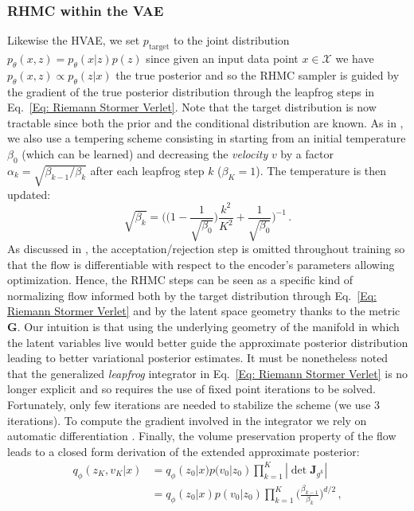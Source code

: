 \documentclass[10pt,journal,compsoc]{IEEEtran}
\begin{document}
    \subsubsection{RHMC within the VAE}\label{Subsec: RHMC within VAE}
    Likewise the HVAE, we set $p_{\mathrm{target}}$ to the joint distribution $p_{\theta}(x, z) = p_{\theta}(x|z)p(z)$ since given an input data point $x\in \mathcal{X}$ we have $p_{\theta}(x, z) \propto p_{\theta}(z|x)$ the true posterior and so the RHMC sampler is guided by the gradient of the true posterior distribution through the leapfrog steps in Eq.~\eqref{Eq: Riemann Stormer Verlet}. Note that the target distribution is now tractable since both the prior and the conditional distribution are known. As in \cite{caterini_hamiltonian_2018}, we also use a tempering scheme  consisting in starting from an initial temperature $\beta_0$ (which can be learned) and decreasing the \textit{velocity} $v$ by a factor $\alpha_k = \sqrt{\beta_{k-1} / \beta_k}$ after each leapfrog step $k$ ($\beta_K=1$). The temperature is then updated:
    \[
        \sqrt{\beta_k} = \Biggl(\Biggl(1 - \frac{1}{\sqrt{\beta_0}} \Bigg) \frac{k^2}{K^2} + \frac{1}{\sqrt{\beta_0}} \Bigg)^{-1} \,.
    \] As discussed in \cite{salimans_markov_2015},  the acceptation/rejection step is omitted throughout training so that the flow is differentiable with respect to the encoder's parameters allowing optimization. Hence, the RHMC steps can be seen as a specific kind of normalizing flow informed both by the target distribution through Eq.~\eqref{Eq: Riemann Stormer Verlet} and by the latent space geometry thanks to the metric $\mathbf{G}$. Our intuition is that using the underlying geometry of the manifold in which the latent variables live would better guide the approximate posterior distribution leading to better variational posterior estimates. It must be nonetheless noted that the generalized \textit{leapfrog} integrator in Eq.~\eqref{Eq: Riemann Stormer Verlet} is no longer explicit and so requires the use of fixed point iterations to be solved. Fortunately, only few iterations are needed to stabilize the scheme (we use 3 iterations). To compute the gradient involved in the integrator we rely on automatic differentiation \cite{paszke_automatic_2017}. Finally, the volume preservation property of the flow leads to a closed form derivation of the extended approximate posterior:
\begin{equation*}
    \begin{aligned}
        q_{\phi}(z_K, v_K|x) &= q_{\phi}(z_0|x) p(v_0|z_0) \prod_{k=1}^K |\det \mathbf{J}_{g^k}{}|\\
    &= q_{\phi}(z_0|x) p(v_0|z_0) \prod_{k=1}^K \Big(\frac{\beta_{k-1}}{\beta_k}\Big)^{d/2} \,,
    \end{aligned}
\end{equation*}
\end{document}

